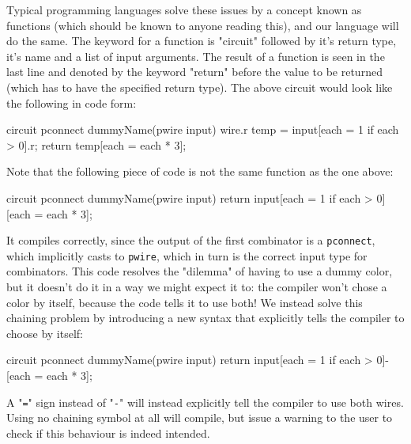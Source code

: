 \documentclass[landscape]{article}
\theoremstyle{plain}
\theoremstyle{definition}
\begin{document}
Typical programming languages solve these issues by a concept known as functions (which should be known to anyone reading this), and our language will do the same. The keyword for a function is "circuit" followed by it's return type, it's name and a list of input arguments. The result of a function is seen in the last line and denoted by the keyword "return" before the value to be returned (which has to have the specified return type). The above circuit would look like the following in code form:
\begin{langname}
circuit pconnect dummyName(pwire input)
{
  wire.r temp = input[each = 1 if each > 0].r;
  return temp[each = each * 3];
}
\end{langname}
Note that the following piece of code is not the same function as the one above:
\begin{langname}
circuit pconnect dummyName(pwire input)
{
  return input[each = 1 if each > 0][each = each * 3];
}
\end{langname}
It compiles correctly, since the output of the first combinator is a \texttt{pconnect}, which implicitly casts to \texttt{pwire}, which in turn is the correct input type for combinators. This code resolves the "dilemma" of having to use a dummy color, but it doesn't do it in a way we might expect it to: the compiler won't chose a color by itself, because the code tells it to use both! We instead solve this chaining problem by introducing a new syntax that explicitly tells the compiler to choose by itself:
\begin{langname}
circuit pconnect dummyName(pwire input)
{
  return input[each = 1 if each > 0]-[each = each * 3];
}
\end{langname}
A "\texttt{=}" sign instead of "\texttt{-}" will instead explicitly tell the compiler to use both wires. Using no chaining symbol at all will compile, but issue a warning to the user to check if this behaviour is indeed intended.
\end{document}
